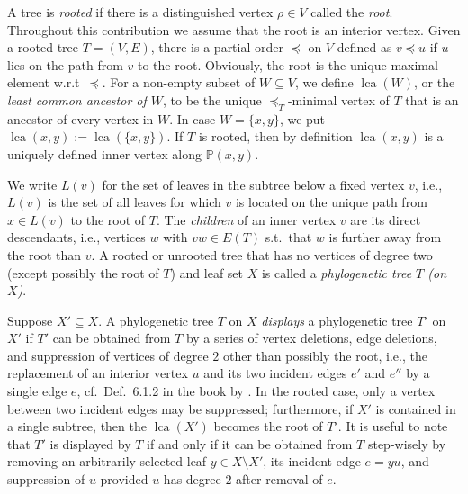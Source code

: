 \documentclass[smallextended]{svjour3}
\newcommand{\rev}[1]{\begingroup\color{blue}#1\endgroup}
\newcommand{\lca}[1]{\mathop{lca}(#1)}
\begin{document}
A tree is \emph{rooted} if there is a distinguished vertex $\rho\in V$
called the \emph{root}. Throughout this contribution we assume that the
root is an interior vertex. \rev{  Given a rooted tree $T=(V,E)$, there is a partial
order $\preceq$ on $V$ defined as  $ v \preceq u$ if 
$u$ lies on the path from $v$ to the root. Obviously,
the root is the unique maximal element w.r.t\ $\preceq$.
For a non-empty subset of $W\subseteq V$, we define $\lca{W}$, or
the \emph{least common ancestor of $W$}, to be the unique
$\preceq_T$-minimal vertex of $T$ that is an ancestor of every vertex in
$W$. In case $W=\{x,y \}$, we put $\lca{x,y}:=\lca{\{x,y\}}$.}
If $T$ is rooted, then by definition $\lca{x,y}$ is a uniquely defined
inner vertex along $\mathbb{P}(x,y)$.

We write $L(v)$ for the set of leaves in the subtree below a fixed vertex
$v$, i.e., $L(v)$ is the set of all leaves for which $v$ is located on the
unique path from $x\in L(v)$ to the root of $T$. The \emph{children} of an
inner vertex $v$ are its direct descendants, i.e., vertices $w$ with $vw\in
E(T)$ s.t.\ that $w$ is further away from the root than $v$.  A rooted or
unrooted tree that has no vertices of degree two \rev{(except possibly the root of $T$)}
and leaf set $X$
is called a \emph{phylogenetic tree $T$ (on $X$)}.

Suppose $X'\subseteq X$. A phylogenetic tree $T$ on $X$ \emph{displays} a
phylogenetic tree $T'$ on $X'$ if $T'$ can be obtained from $T$ by a series
of vertex deletions, edge deletions, and suppression of vertices of degree
$2$ other than possibly the root, i.e., the replacement of an interior
vertex $u$ and its two incident edges $e'$ and $e''$ by a single edge $e$,
cf.\ \rev{Def.\ 6.1.2 in the book by \citet{sem-ste-03a}}. In the rooted
case, only a vertex between two \rev{incident} edges may be suppressed;
furthermore, if $X'$ is contained in a single subtree, then the $\lca{X'}$
becomes the root of $T'$. It is useful to note that $T'$ is displayed by
$T$ if and only if it can be obtained from $T$ step-wisely by removing an
arbitrarily selected leaf $y\in X\setminus X'$, its incident edge $e=yu$,
and suppression of $u$ provided $u$ has degree $2$ after removal of $e$.
\end{document}
